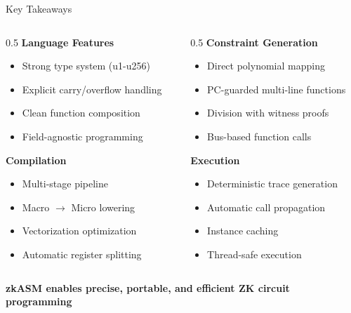 \documentclass[aspectratio=169,11pt]{beamer}
\begin{document}
\begin{frame}{Key Takeaways}

\begin{columns}
\begin{column}{0.5\textwidth}
\textbf{Language Features}
\begin{itemize}
    \item Strong type system (u1-u256)
    \item Explicit carry/overflow handling
    \item Clean function composition
    \item Field-agnostic programming
\end{itemize}

\vspace{0.5em}
\textbf{Compilation}
\begin{itemize}
    \item Multi-stage pipeline
    \item Macro $\to$ Micro lowering
    \item Vectorization optimization
    \item Automatic register splitting
\end{itemize}
\end{column}

\begin{column}{0.5\textwidth}
\textbf{Constraint Generation}
\begin{itemize}
    \item Direct polynomial mapping
    \item PC-guarded multi-line functions
    \item Division with witness proofs
    \item Bus-based function calls
\end{itemize}

\vspace{0.5em}
\textbf{Execution}
\begin{itemize}
    \item Deterministic trace generation
    \item Automatic call propagation
    \item Instance caching
    \item Thread-safe execution
\end{itemize}
\end{column}
\end{columns}

\vspace{1em}
\begin{center}
\textbf{zkASM enables precise, portable, and efficient ZK circuit programming}
\end{center}
\end{frame}
\end{document}
